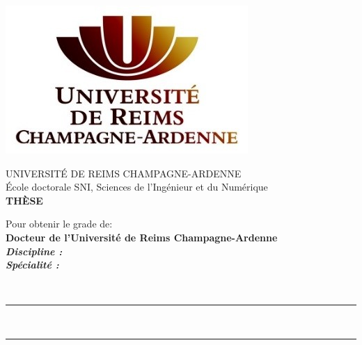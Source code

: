 \documentclass[11pt,a4paper]{book}
\begin{document}
{
\centering

{
	\includegraphics[scale=1]{figures/style/logo_urca_front_page.jpg}
	\vspace{0.3cm}
}

{
	UNIVERSIT\'E DE REIMS CHAMPAGNE-ARDENNE\\
	\vspace{0.3cm}
	\'Ecole doctorale SNI, Sciences de l'Ing\'enieur et du Num\'erique\\
	\vspace{.8cm}
	\huge
	\textbf{TH\`ESE}
	\vspace{.3cm}
}

{
	Pour obtenir le grade de:\\ 
	\vspace{.3cm}
	\Large 
	\textbf{Docteur de l'Université de Reims Champagne-Ardenne}\\
	\vspace{.3cm}
	\large
	\textbf{\textit{Discipline : }\phdDiscipline}\\
	\vspace{.4cm}
	\textbf{\textit{Sp\'ecialit\'e : }\phdSpeciality}
}

{
	\vspace{1cm}
	\vspace{.4cm}
	\Large
	\textbf{\phdAuthor}\\
	\vspace{.4cm}
	\large
	\vspace{.5cm}	
}

{
	\hrule height 2pt
	\vspace{2pt}
	\huge 
	\vspace{1cm}
	\phdTitleFR\\
	\large
	\vspace{0.5cm}
	\phdTitleEN
	\vspace{1.0cm}
	\hrule
	\vspace{1cm}
}

}
\end{document}
